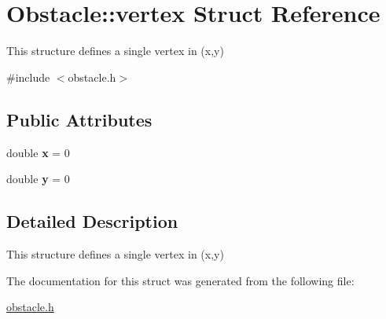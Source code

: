\hypertarget{struct_obstacle_1_1vertex}{\section{Obstacle\-:\-:vertex Struct Reference}
\label{struct_obstacle_1_1vertex}
}


This structure defines a single vertex in (x,y)  




{\ttfamily \#include $<$obstacle.\-h$>$}

\subsection*{Public Attributes}
\begin{DoxyCompactItemize}
\item 
\hypertarget{struct_obstacle_1_1vertex_a898ca35e94df9798a13e85548ce951ad}{double {\bfseries x} = 0}\label{struct_obstacle_1_1vertex_a898ca35e94df9798a13e85548ce951ad}

\item 
\hypertarget{struct_obstacle_1_1vertex_a719b890237fe71d764bc3dad269c4e79}{double {\bfseries y} = 0}\label{struct_obstacle_1_1vertex_a719b890237fe71d764bc3dad269c4e79}

\end{DoxyCompactItemize}


\subsection{Detailed Description}
This structure defines a single vertex in (x,y) 

The documentation for this struct was generated from the following file\-:\begin{DoxyCompactItemize}
\item 
\hyperlink{obstacle_8h}{obstacle.\-h}\end{DoxyCompactItemize}
